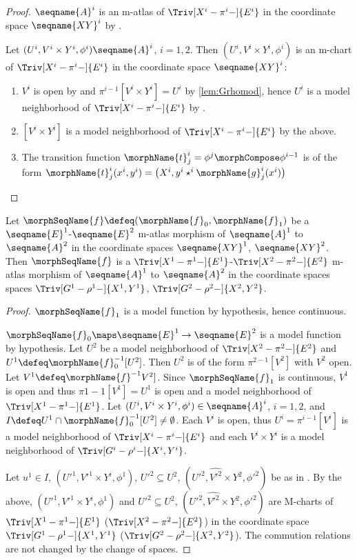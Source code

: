 \documentclass{article}
\begin{document}
\begin{lemma}
\begin{proof}
$\seqname{A}^i$ is an m-atlas of $\Triv[X^i-\pi^i-]{E^i}$ in the coordinate
space $\seqname{XY}^i$ by .

Let $(U^i, V^i \times Y^i, \phi^i) \seqname{A}^i$, $i=1,2$. Then
$(U^i, V^i \times Y^i, \phi^i)$ is an m-chart of $\Triv[X^i-\pi^i-]{E^i}$ in the
coordinate space $\seqname{XY}^i$:

\begin{enumerate}
\item
$V^i$ is open by  and
$\pi^{i-1}[V^i \times Y^i] = U^i$ by \cref{lem:Grhomod}, hence $U^i$ is a
model neighborhood of $\Triv[X^i-\pi^i-]{E^i}$ by .
\item
$[V^i \times Y^i]$ is a model neighborhood of $\Triv[X^i-\pi^i-]{E^i}$ by the
above.
\item
The transition function $\morphName{t}^i_j = \phi^j \morphCompose \phi^{i-1}$
is of the form
$
  \morphName{t}^i_j(x^i,y^i) =
  \bigl ( X^i, y^i \star^i \morphName{g}^i_j(x^i) \bigr )
$
\end{enumerate}
\end{proof}

Let $\morphSeqName{f} \defeq (\morphName{f}_0, \morphName{f}_1)$ be a
$\seqname{E}^1$-$\seqname{E}^2$ m-atlas morphism of $\seqname{A}^1$ to
$\seqname{A}^2$ in the coordinate spaces $\seqname{XY}^1$,
$\seqname{XY}^2$. Then $\morphSeqName{f}$ is a
$\Triv[X^1-\pi^1-]{E^1}$-$\Triv[X^2-\pi^2-]{E^2}$ m-atlas morphism of
$\seqname{A}^1$ to $\seqname{A}^2$ in the coordinate spaces spaces
$\Triv[G^1-\rho^1-]{X^1,Y^1}$, $\Triv[G^2-\rho^2-]{X^2,Y^2}$.

\begin{proof}
$\morphSeqName{f}_1$ is a model function by hypothesis, hence continuous.

$\morphSeqName{f}_0 \maps \seqname{E}^1 \to \seqname{E}^2$ is a model
function by hypothesis. Let $U^2$ be a model neighborhood of
$\Triv[X^2-\pi^2-]{E^2}$ and $U^1 \defeq \morphName{f}^{-1}_0[U^2]$. Then
$U^2$ is of the form $\pi^{2-1}[V^2]$ with $V^2$ open. Let
$V^1 \defeq \morphName{f}^{-1}V^2]$. Since $\morphSeqName{f}_1$ is
continuous, $V^1$ is open and thus $\pi{1-1}[V^1] = U^1$ is open and a
model neighborhood of  $\Triv[X^1-\pi^1-]{E^1}$.
Let $(U^i,V^i \times Y^i, \phi^i) \in \seqname{A}^i$, $i=1,2$, and
$I \defeq U^1 \cap \morphName{f}^{-1}_0[U^2] \neq \emptyset$. Each $V^i$ is
open, thus $U^i = \pi^{i-1}[V^i]$ is a model neighborhood of
$\Triv[X^i-\pi^i-]{E^i}$ and each $V^i \times Y^i$ is a model
neighborhood of $\Triv[G^i-\rho^i-]{X^i,Y^i}$.

Let $u^1 \in I$, $(U'^1, V'^1 \times Y^i, \phi^1)$,
$U'^2 \subseteq U^2$, $(U'^2, \hat{V'^2} \times Y^2, \phi'^2)$ be as in
. By the above, $(U'^1, V'^1 \times Y^i, \phi^1)$
and $U'^2 \subseteq U^2$, $(U'^2, \hat{V'^2} \times Y^2, \phi'^2)$ are
M-charts of $\Triv[X^1-\pi^1-]{E^1}$ ($\Triv[X^2-\pi^2-]{E^2}$)
in the coordinate space
$\Triv[G^1-\rho^1-]{X^1,Y^1}$ ($\Triv[G^2-\rho^2-]{X^2,Y^2}$). The
commution relations are not changed by the change of spaces.
\end{proof}
\end{lemma}
\end{document}
